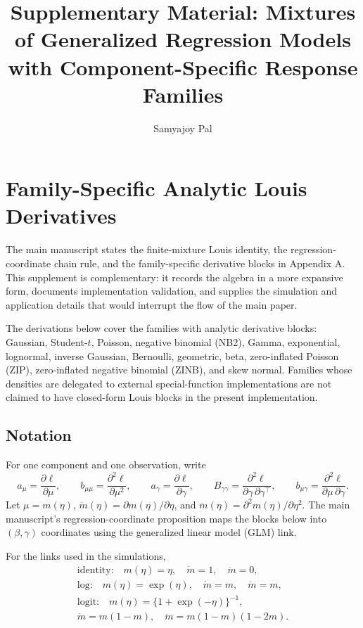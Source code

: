 \documentclass{article}
\title{Supplementary Material: Mixtures of Generalized Regression Models with
Component-Specific Response Families}
\author{Samyajoy Pal}
\date{}
\begin{document}
\maketitle

\section{Family-Specific Analytic Louis Derivatives}
\label{sec:supp_louis}

The main manuscript states the finite-mixture Louis identity, the
regression-coordinate chain rule, and the family-specific derivative blocks in
Appendix A.  This supplement is complementary: it records the algebra in a
more expansive form, documents implementation validation, and supplies the
simulation and application details that would interrupt the flow of the main
paper.

The derivations below cover the families with analytic derivative blocks:
Gaussian, Student-$t$, Poisson, negative binomial (NB2), Gamma, exponential,
lognormal, inverse Gaussian, Bernoulli, geometric, beta, zero-inflated Poisson
(ZIP), zero-inflated negative binomial (ZINB), and skew normal.  Families whose
densities are delegated to external special-function implementations are not
claimed to have closed-form Louis blocks in the present implementation.

\subsection{Notation}

For one component and one observation, write
\[
    a_\mu=\frac{\partial \ell}{\partial\mu},\qquad
    b_{\mu\mu}=\frac{\partial^2\ell}{\partial\mu^2},\qquad
    a_\gamma=\frac{\partial\ell}{\partial\gamma},\qquad
    B_{\gamma\gamma}=\frac{\partial^2\ell}{\partial\gamma\,\partial\gamma^\top},
    \qquad
    b_{\mu\gamma}=\frac{\partial^2\ell}{\partial\mu\,\partial\gamma}.
\]
Let $\mu=m(\eta)$, $\dot m(\eta)=\partial m(\eta)/\partial\eta$, and
$\ddot m(\eta)=\partial^2m(\eta)/\partial\eta^2$.  The main manuscript's
regression-coordinate proposition maps the blocks below into
$(\beta,\gamma)$ coordinates using the generalized linear model (GLM) link.

For the links used in the simulations,
\[
    \begin{gathered}
    \text{identity:}\quad m(\eta)=\eta,\quad
    \dot m=1,\quad \ddot m=0,\\
    \text{log:}\quad m(\eta)=\exp(\eta),\quad
    \dot m=m,\quad \ddot m=m,\\
    \text{logit:}\quad m(\eta)=\{1+\exp(-\eta)\}^{-1},\\
    \dot m=m(1-m),\quad
    \ddot m=m(1-m)(1-2m).
    \end{gathered}
\]
\end{document}
